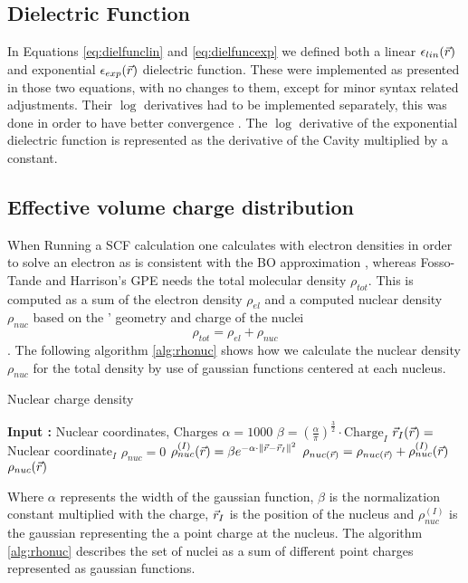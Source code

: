\documentclass[../master_thesis.tex]{subfiles}
\begin{document}
\subsection{Dielectric Function}
In Equations \ref{eq:dielfunclin} and \ref{eq:dielfuncexp} we defined both a
linear $\epsilon_{lin}(\vec{r})$ and exponential $\epsilon_{exp}(\vec{r})$ dielectric function. These were implemented as presented
in those two equations, with no changes to them, except for minor syntax related
adjustments. Their $\log$ derivatives had to be implemented separately,
this was done in order to have better convergence \cite{FossoTande:2013ka}. The
$\log$ derivative of the exponential dielectric function is represented as the
derivative of the Cavity multiplied by a constant.

\subsection{Effective volume charge distribution}
When Running a \ac{SCF} calculation one calculates with electron densities in order
to solve an electron \SE as is consistent with the \ac{BO} approximation
\cite{Cramer:2004, Konishi:2009}, whereas Fosso-Tande and Harrison's \ac{GPE}
needs the total molecular density $\rho_{tot}$. This is computed as a sum of the electron
density $\rho_{el}$ and a computed nuclear density $\rho_{nuc}$ based on the '
geometry and charge of the nuclei
\begin{equation}
  \rho_{tot} = \rho_{el} + \rho_{nuc}
\end{equation}.
The following algorithm \ref{alg:rhonuc} shows how we calculate the nuclear
density $\rho_{nuc}$ for the total density by use of gaussian functions centered at
each nucleus.
\begin{algorithm}
  \caption{Nuclear charge density}\label{alg:rhonuc}
  \begin{algorithmic}
    \STATE \textbf{Input :} Nuclear coordinates, Charges
    \STATE $\alpha = 1000$
    \STATE $\beta = (\frac{\alpha}{\pi})^{\frac{3}{2}} \cdot \text{Charge}_I$
    \STATE $\vec{r}_I(\vec{r}) =$ Nuclear coordinate$_I$
    \STATE $\rho_{nuc} = 0$
    \STATE $\rho_{nuc}^{(I)}(\vec{r}) = \beta e^{-\alpha\cdot\lVert\vec{r} -\vec{r}_I\rVert^2}$
    \STATE $\rho_{nuc(\vec{r})} = \rho_{nuc(\vec{r})} + \rho_{nuc}^{(I)}(\vec{r})$
    \ENDFOR
    \RETURN $\rho_{nuc}(\vec{r})$
  \end{algorithmic}
\end{algorithm}

Where $\alpha$ represents the width of the gaussian function, $\beta$ is the normalization
constant multiplied with the charge, $\vec{r}_I$ is the position of the nucleus and
$\rho_{nuc}^{(I)}$ is the gaussian representing the a point charge at the nucleus.
The algorithm \ref{alg:rhonuc} describes the set of nuclei as a sum of different point charges
represented as gaussian functions.
\end{document}
